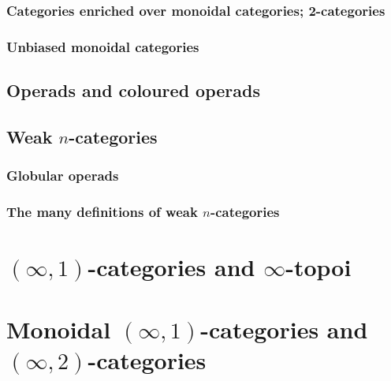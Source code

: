                 \begin{definition} \label{def: braided_and_symmetric_monoidal_categories}  
                    
                \end{definition}
                
            \subsubsection{Categories enriched over monoidal categories; 2-categories}
            
            \subsubsection{Unbiased monoidal categories}
        
        \subsection{Operads and coloured operads}
        
        \subsection{Weak \texorpdfstring{$n$}{}-categories}
            \subsubsection{Globular operads}
            
            \subsubsection{The many definitions of weak \texorpdfstring{$n$}{}-categories}
            
    \section{\texorpdfstring{$(\infty, 1)$}{}-categories and \texorpdfstring{$\infty$}{}-topoi}
    
    \section{Monoidal \texorpdfstring{$(\infty, 1)$}{}-categories and \texorpdfstring{$(\infty, 2)$}{}-categories}
